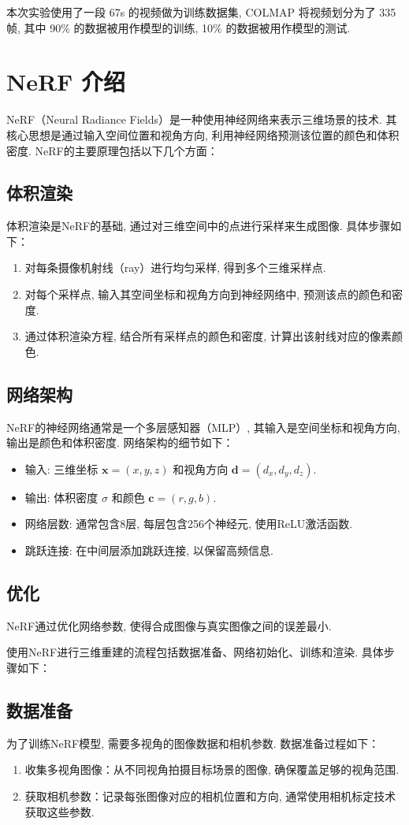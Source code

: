 \documentclass[notitlepage,cs4size,punct,oneside]{ctexrep}
\numberwithin{equation}{chapter}
\theoremstyle{mystyle}
\begin{document}
本次实验使用了一段 67s 的视频做为训练数据集, COLMAP 将视频划分为了 335 帧, 其中 90\% 的数据被用作模型的训练, 10\% 的数据被用作模型的测试.

\section{NeRF 介绍}
NeRF（Neural Radiance Fields）是一种使用神经网络来表示三维场景的技术. 其核心思想是通过输入空间位置和视角方向, 利用神经网络预测该位置的颜色和体积密度. NeRF的主要原理包括以下几个方面：
\subsection{体积渲染}
体积渲染是NeRF的基础, 通过对三维空间中的点进行采样来生成图像. 具体步骤如下：
\begin{enumerate}
    \item 对每条摄像机射线（ray）进行均匀采样, 得到多个三维采样点.
    \item 对每个采样点, 输入其空间坐标和视角方向到神经网络中, 预测该点的颜色和密度.
    \item 通过体积渲染方程, 结合所有采样点的颜色和密度, 计算出该射线对应的像素颜色.
\end{enumerate}
\subsection{网络架构}
NeRF的神经网络通常是一个多层感知器（MLP）, 其输入是空间坐标和视角方向, 输出是颜色和体积密度. 网络架构的细节如下：
\begin{itemize}
    \item 输入: 三维坐标 $\mathbf{x} = (x, y, z)$ 和视角方向 $\mathbf{d} = (d_x, d_y, d_z)$.
    \item 输出: 体积密度 $\sigma$ 和颜色 $\mathbf{c} = (r, g, b)$.
    \item 网络层数: 通常包含8层, 每层包含256个神经元, 使用ReLU激活函数.
    \item 跳跃连接: 在中间层添加跳跃连接, 以保留高频信息.
\end{itemize}
\subsection{优化}
NeRF通过优化网络参数, 使得合成图像与真实图像之间的误差最小.

使用NeRF进行三维重建的流程包括数据准备、网络初始化、训练和渲染. 具体步骤如下：
\subsection{数据准备}
为了训练NeRF模型, 需要多视角的图像数据和相机参数. 数据准备过程如下：
\begin{enumerate}
    \item 收集多视角图像：从不同视角拍摄目标场景的图像, 确保覆盖足够的视角范围.
    \item 获取相机参数：记录每张图像对应的相机位置和方向, 通常使用相机标定技术获取这些参数.
\end{enumerate}
\end{document}
